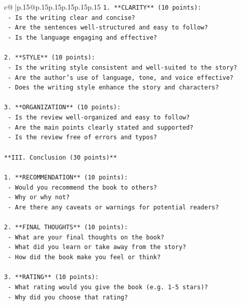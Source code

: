 \documentclass{article}
\begin{document}
{\begin{supertabular}{c@{$\;$}|p{.15\linewidth}@{}p{.15\linewidth}p{.15\linewidth}p{.15\linewidth}p{.15\linewidth}p{.15\linewidth}}
{{{\texttt{1. **CLARITY** (10 points):} \\
\texttt{   {-} Is the writing clear and concise?} \\
\texttt{   {-} Are the sentences well{-}structured and easy to follow?} \\
\texttt{   {-} Is the language engaging and effective?} \\
\\ 
\texttt{2. **STYLE** (10 points):} \\
\texttt{   {-} Is the writing style consistent and well{-}suited to the story?} \\
\texttt{   {-} Are the author's use of language, tone, and voice effective?} \\
\texttt{   {-} Does the writing style enhance the story and characters?} \\
\\ 
\texttt{3. **ORGANIZATION** (10 points):} \\
\texttt{   {-} Is the review well{-}organized and easy to follow?} \\
\texttt{   {-} Are the main points clearly stated and supported?} \\
\texttt{   {-} Is the review free of errors and typos?} \\
\\ 
\texttt{**III. Conclusion (30 points)**} \\
\\ 
\texttt{1. **RECOMMENDATION** (10 points):} \\
\texttt{   {-} Would you recommend the book to others?} \\
\texttt{   {-} Why or why not?} \\
\texttt{   {-} Are there any caveats or warnings for potential readers?} \\
\\ 
\texttt{2. **FINAL THOUGHTS** (10 points):} \\
\texttt{   {-} What are your final thoughts on the book?} \\
\texttt{   {-} What did you learn or take away from the story?} \\
\texttt{   {-} How did the book make you feel or think?} \\
\\ 
\texttt{3. **RATING** (10 points):} \\
\texttt{   {-} What rating would you give the book (e.g. 1{-}5 stars)?} \\
\texttt{   {-} Why did you choose that rating?} \\
}}}
\end{supertabular}}
\end{document}
